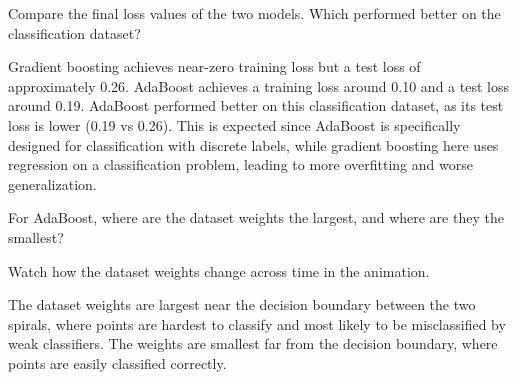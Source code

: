 \documentclass{article}
\begin{document}
\begin{problem}[2]
    Compare the final loss values of the two models. Which performed better on the classification dataset?
\end{problem}
\begin{solution}
Gradient boosting achieves near-zero training loss but a test loss
of approximately 0.26. AdaBoost achieves a training loss around 0.10
 and a test loss around 0.19. AdaBoost performed better on this classification dataset, 
 as its test loss is lower (0.19 vs 0.26). This is expected since AdaBoost is specifically
  designed for classification with discrete labels, while gradient boosting here uses 
  regression on a classification problem, leading to more overfitting and worse generalization.

\end{solution}

\begin{problem}[2]
    For AdaBoost, where are the dataset weights the largest, and where are they the smallest?
\end{problem}
\begin{hint}
    Watch how the dataset weights change across time in the animation.
\end{hint}
\begin{solution}
The dataset weights are largest near the decision boundary between the two spirals, 
where points are hardest to classify and most likely to be misclassified by weak classifiers.
 The weights are smallest far from the decision boundary, where points are easily classified correctly.
\end{solution}
\end{document}
